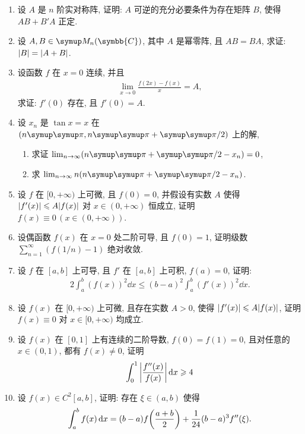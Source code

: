 \documentclass{ctexart}
\let\umathpi\pi
\renewcommand\pi{\symup\umathpi}%
\let\ge\geqslant
\let\le\leqslant
\newcommand{\limit}[2]{\lim_{#1 \to #2}}
\newcommand{\C}{\ensuremath{\symbb{C}}}
\begin{document}
\begin{enumerate}[series=exer]
    \item 设 $ A $ 是 $ n $ 阶实对称阵, 证明: $ A $ 可逆的充分必要条件为存在矩阵 $ B $, 使得 $ AB + B'A $ 正定.
    \item 设 $ A, B \in \MM[\C] $, 其中 $ A $ 是幂零阵, 且 $ AB = BA $, 求证: $ \abs{B} = \abs{A + B} $. 
    \item 设函数 $ f $ 在 $ x = 0 $ 连续, 并且
    \begin{align*}
        \limit{x}{0}\frac{f(2x) - f(x)}{x} = A,
    \end{align*}
    求证: $ f'(0) $ 存在, 且 $ f'(0) = A $. 
    \item 设 $ x_{n} $ 是 $ \tan x = x $ 在 $ (n\pi, n\pi + \pi/2) $ 上的解,
    \begin{enumerate}
        \item 求证 $ \limit{n}{\infty}(n\pi + \pi/2 - x_{n}) = 0 $,
        \item 求 $ \limit{n}{\infty} n(n\pi + \pi/2 - x_{n}) $.  
    \end{enumerate}
    \item 设 $ f $ 在 $ [0, +\infty) $ 上可微, 且 $ f(0) = 0 $, 并假设有实数 $ A $ 使得 $ \abs{f'(x)} \le A\abs{f(x)} $ 对 $ x \in (0, +\infty) $ 恒成立, 证明 $ f(x) \equiv 0\,(x \in (0, +\infty)) $.  
    \item 设偶函数 $ f(x) $ 在 $ x = 0 $ 处二阶可导, 且 $ f(0) = 1 $, 证明级数 $ \sum_{n = 1}^{\infty} (f(1/n) - 1) $ 绝对收敛.
    \item 设 $ f $ 在 $ [a, b] $ 上可导, 且 $ f' $ 在 $ [a, b] $ 上可积, $ f(a) = 0 $, 证明:
    \begin{align*}
        2\int_{a}^{b}(f(x))^{2} \dd{x} \le (b-a)^{2} \int_{a}^{b} (f'(x))^{2} \dd{x}.
    \end{align*}
    \item 设 $ f(x) $ 在 $ [0, +\infty) $ 上可微, 且存在实数 $ A > 0 $, 使得 $ \abs{f'(x)} \le A\abs{f(x)} $, 证明 $ f(x) \equiv 0 $ 对 $ x \in [0, +\infty) $ 均成立.
    \item 设 $ f(x) $ 在 $ [0, 1] $ 上有连续的二阶导数, $ f(0) = f(1) = 0 $, 且对任意的 $ x \in (0, 1) $, 都有 $ f(x) \ne 0 $, 证明
    \begin{align*}
        \int_{0}^{1} \abs{f''(x)\over f(x)} \dd{x} \ge 4
    \end{align*}
    \item 设 $ f(x) \in C^{2}[a, b] $, 证明: 存在 $ \xi \in (a, b) $ 使得
    \begin{align*}
        \int_{a}^{b} f(x) \dd{x} = (b - a) f\qty(\frac{a + b}{2}) + \frac{1}{24}(b - a)^{3} f''(\xi).

\end{align*}
\end{enumerate}
\end{document}
